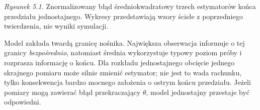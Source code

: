 \begin{center}
\end{center}
\noindent\emph{Rysunek 5.1.} Znormalizowany błąd średniokwadratowy
trzech estymatorów końca przedziału jednostajnego. Wykresy
przedstawiają wzory ścisłe z poprzedniego twierdzenia,
nie wyniki symulacji.

\begin{uwaga}
Model zakłada twardą granicę nośnika. Największa obserwacja
informuje o tej granicy \emph{bezpośrednio}, natomiast średnia
wykorzystuje typowy poziom próby i rozprasza informację o końcu.
Dla rozkładu jednostajnego obcięcie jednego skrajnego pomiaru
może silnie zmienić estymator; nie jest to wada rachunku, tylko
konsekwencja bardzo mocnego założenia o ostrym końcu przedziału.
Jeżeli pomiary mogą zawierać błąd przekraczający $\theta$,
model jednostajny przestaje być odpowiedni.
\end{uwaga}

